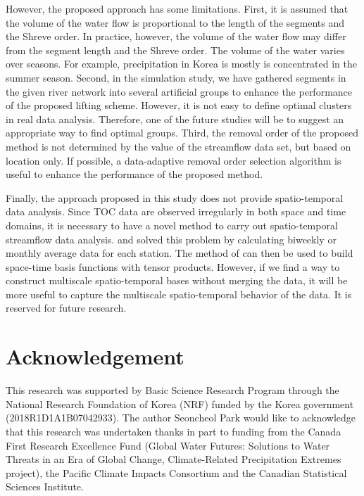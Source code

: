 \documentclass[11pt,titlepage]{article}
\begin{document}
However, the proposed approach has some limitations. First, it is assumed that the volume of the water flow is proportional to the length of the segments and the Shreve order. In practice, however, the volume of the water flow may differ from the segment length and the Shreve order. The volume of the water varies over seasons. For example, precipitation in Korea is mostly is concentrated in the summer season. Second, in the simulation study, we have gathered segments in the given river network into several artificial groups to enhance the performance of the proposed lifting scheme. However, it is not easy to define optimal clusters in real data analysis. Therefore, one of the future studies will be to suggest an appropriate way to find optimal groups. Third, the removal order of the proposed method is not determined by the value of the streamflow data set, but based on location only. If possible, a data-adaptive removal order selection algorithm is useful to enhance the performance of the proposed method. %

Finally, the approach proposed in this study does not provide spatio-temporal data analysis. Since TOC data are observed irregularly in both space and time domains, it is necessary to have a novel method to carry out spatio-temporal streamflow data analysis. \cite{Lindstrom2014} and \cite{ODonnell2014} solved this problem by calculating biweekly or monthly average data for each station. The method of \cite{ODonnell2014} can then be used to build space-time basis functions with tensor products. However, if we find a way to construct multiscale spatio-temporal bases without merging the data, it will be more useful to capture the multiscale spatio-temporal behavior of the data. It is reserved for future research.


\section*{Acknowledgement}
This research was supported by Basic Science Research Program through the National Research Foundation of Korea (NRF) funded by the Korea government (2018R1D1A1B07042933). The author Seoncheol Park would like to acknowledge that this research was undertaken thanks in part to funding from the Canada First Research Excellence Fund (Global Water Futures: Solutions to Water Threats in an Era of Global Change, Climate-Related Precipitation Extremes project), the Pacific Climate Impacts Consortium and the Canadian Statistical Sciences Institute.
\end{document}
